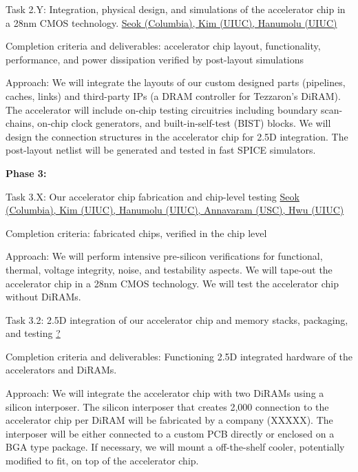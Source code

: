 Task 2.Y: Integration, physical design, and simulations of the accelerator chip in a 28nm CMOS technology. \underline{Seok (Columbia), Kim (UIUC), Hanumolu (UIUC)}

   Completion criteria and deliverables: accelerator chip layout, functionality, performance, and power dissipation verified by post-layout simulations

   Approach: We will integrate the layouts of our custom designed parts (pipelines, caches, links) and third-party IPs (a DRAM controller for Tezzaron's DiRAM). The accelerator will include on-chip testing circuitries including boundary scan-chains, on-chip clock generators, and built-in-self-test (BIST) blocks. We will design the connection structures in the accelerator chip for 2.5D integration. The post-layout netlist will be generated and tested in fast SPICE simulators. 

\noindent
\textbf{Phase 3:}

Task 3.X: Our accelerator chip fabrication and chip-level testing \underline{Seok (Columbia), Kim (UIUC), Hanumolu (UIUC), Annavaram (USC), Hwu (UIUC)}

   Completion criteria: fabricated chips, verified in the chip level

   Approach: We will perform intensive pre-silicon verifications for functional, thermal, voltage integrity, noise, and testability aspects. We will tape-out the accelerator chip in a 28nm CMOS technology. We will test the accelerator chip without DiRAMs. 

Task 3.2: 2.5D integration of our accelerator chip and memory stacks, packaging, and testing \underline{?}

   Completion criteria and deliverables: Functioning 2.5D integrated hardware of the accelerators and DiRAMs. 

   Approach:  We will integrate the accelerator chip with two DiRAMs using a silicon interposer. The silicon interposer that creates 2,000 connection to the accelerator chip per DiRAM will be fabricated by a company (XXXXX). The interposer will be either connected to a custom PCB directly or enclosed on a BGA type package. If necessary, we will mount a off-the-shelf cooler, potentially modified to fit, on top of the accelerator chip. 
